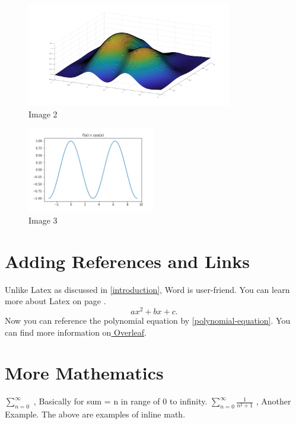 \documentclass{report}
\theoremstyle{plain} %
\begin{document}
\begin{figure}[ht]
    \centering
    \includegraphics[width=0.8\textwidth]{plot.jpg}
    \caption{Image 2}
    \label{fig:2}
\end{figure}

\newpage

\blindtext
\begin{figure} %
\includegraphics[width=0.5\textwidth]{images/example_graph.png}
\caption{Image 3}
\end{figure}
\blindtext
\blindtext

\newpage 
\section{Adding References and Links}
Unlike Latex as discussed in \ref{introduction}, Word is user-friend.
\newline You can learn more about Latex on page \pageref{introduction}.
\newline \begin{equation} \label{polynomial-equation}
ax^2 + bx +c.
\end{equation}
Now you can reference the polynomial equation by \eqref{polynomial-equation}.
You can find more information on\href{https://www.overleaf.com/} { Overleaf}.


\section{More Mathematics}
\begin{center}
$\sum_{n=0} ^ {\infty}$ , Basically for sum = n in range of 0 to infinity.
\vspace{4mm}
 \newline $\sum_{n=0} ^ {\infty}\frac{1}{n^2+1}$ , Another Example. 
 \vspace{4mm}
 \newline The above are examples of inline math.
\end{center} 
 
\end{document}
